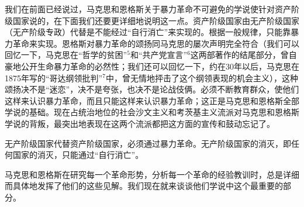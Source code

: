 我们在前面已经说过，马克思和恩格斯关于暴力革命不可避免的学说使针对资产阶级国家说的，在下面我们还要更详细地说明这一点。资产阶级国家由无产阶级国家（无产阶级专政）代替是{\kaishu 不能}经过“自行消亡”来实现的。根据一般规律，只能靠暴力革命来实现。恩格斯对暴力革命的颂扬同马克思的屡次声明完全符合（我们可以回忆一下，马克思在“哲学的贫困”$^{5}$和“共产党宣言”$^{6}$这两部著作的结尾部分，曾自豪地公开生命暴力革命的必然性；我们还可以回忆一下，约在30年以后，马克思在1875年写的“哥达纲领批判”$^{7}$中，曾无情地抨击了这个纲领表现的机会主义），这种颂扬决不是“迷恋”，决不是夸张，也决不是论战伎俩。必须不断教育群众，使他们{\kaishu 这样}来认识暴力革命，而且只能这样来认识暴力革命；这正是马克思和恩格斯{\kaishu 全部}学说的基础。现在占统治地位的社会沙文主义和考茨基主义流派对马克思和恩格斯学说的背叛，最突出地表现在这两个流派都把{\kaishu 这方面}的宣传和鼓动忘记了。

无产阶级国家代替资产阶级国家，必须通过暴力革命。无产阶级国家的消灭，即任何国家的消灭，只能通过“自行消亡”。

马克思和恩格斯在研究每一个革命形势，分析每一个革命的经验教训时，总是详细而具体地发挥了他们的这些见解。我们现在就来谈谈他们学说中这个最重要的部分。












